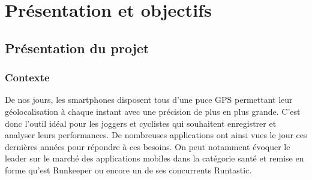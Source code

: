\part{Présentation et objectifs}
\chapter{Présentation du projet}
\section{Contexte}
De nos jours, les smartphones disposent tous d'une puce GPS permettant leur géolocalisation à chaque instant avec une précision de plus en plus grande. C'est donc l'outil idéal pour les joggers et cyclistes qui souhaitent enregistrer et analyser leurs performances. De nombreuses applications ont ainsi vues le jour ces dernières années pour répondre à ces besoins. On peut notamment évoquer le leader sur le marché des applications mobiles dans la catégorie santé et remise en forme qu'est Runkeeper ou encore un de ses concurrents Runtastic.\bigskip \bigskip
